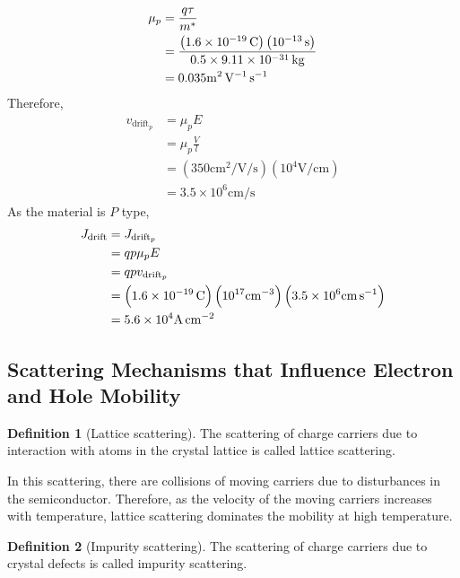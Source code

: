 \documentclass[titlepage, fleqn, a4paper, 12pt, twoside]{article}
\theoremstyle{definition}
\newtheorem{definition}{Definition}
\theoremstyle{theorem}
\let\Oldsubsection\subsection
\renewcommand{\subsection}{\FloatBarrier\Oldsubsection}
\begin{document}
\begin{solution}
	\begin{align*}
		\mu_p &= \frac{q \tau}{m^*}\\
		&= \frac{\left( 1.6 \times 10^{-19} \coulomb \right) \left( 10^{-13} \second \right)}{0.5 \times 9.11 \times 10^{-31} \kilogram}\\
		&= 0.035 \si{\metre\squared\per\volt\per\second}
	\end{align*}
	Therefore,
	\begin{align*}
		v_{\text{drift}_p} &= \mu_p E\\
		&= \mu_p \frac{V}{l}\\
		&= \left( 350 \si{\centi\metre\squared\per\volt\per\second} \right) \left( 10^4 \si{\volt\per\centi\metre} \right)\\
		&= 3.5 \times 10^6 \si{\centi\metre\per\second}
	\end{align*}
	As the material is $P$ type,
	\begin{align*}
		J_{\text{drift}} &= J_{\text{drift}_p}\\
		&= q p \mu_p E\\
		&= q p v_{\text{drift}_p}\\
		&= \left( 1.6 \times 10^{-19} \coulomb \right) \left( 10^{17} \si{\per\centi\metre\cubed} \right) \left( 3.5 \times 10^6 \si{\centi\metre\per\second} \right)\\
		&= 5.6 \times 10^4 \si{\ampere\per\centi\metre\squared}
	\end{align*}
\end{solution}

\subsection{Scattering Mechanisms that Influence Electron and Hole Mobility}

\begin{definition}[Lattice scattering]
	The scattering of charge carriers due to interaction with atoms in the crystal lattice is called lattice scattering.
\end{definition}

In this scattering, there are collisions of moving carriers due to disturbances in the semiconductor.
Therefore, as the velocity of the moving carriers increases with temperature, lattice scattering dominates the mobility at high temperature.

\begin{definition}[Impurity scattering]
	The scattering of charge carriers due to crystal defects is called impurity scattering.
\end{definition}
\end{document}
